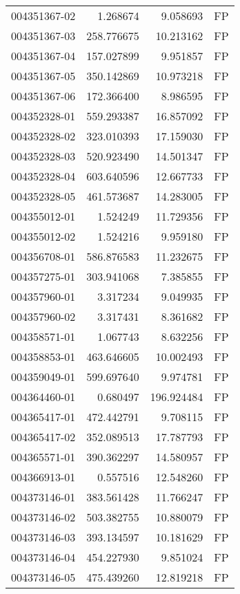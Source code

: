 \begin{tabular}{lrrl}
004351367-02 &    1.268674 &     9.058693 &   FP \\
004351367-03 &  258.776675 &    10.213162 &   FP \\
004351367-04 &  157.027899 &     9.951857 &   FP \\
004351367-05 &  350.142869 &    10.973218 &   FP \\
004351367-06 &  172.366400 &     8.986595 &   FP \\
004352328-01 &  559.293387 &    16.857092 &   FP \\
004352328-02 &  323.010393 &    17.159030 &   FP \\
004352328-03 &  520.923490 &    14.501347 &   FP \\
004352328-04 &  603.640596 &    12.667733 &   FP \\
004352328-05 &  461.573687 &    14.283005 &   FP \\
004355012-01 &    1.524249 &    11.729356 &   FP \\
004355012-02 &    1.524216 &     9.959180 &   FP \\
004356708-01 &  586.876583 &    11.232675 &   FP \\
004357275-01 &  303.941068 &     7.385855 &   FP \\
004357960-01 &    3.317234 &     9.049935 &   FP \\
004357960-02 &    3.317431 &     8.361682 &   FP \\
004358571-01 &    1.067743 &     8.632256 &   FP \\
004358853-01 &  463.646605 &    10.002493 &   FP \\
004359049-01 &  599.697640 &     9.974781 &   FP \\
004364460-01 &    0.680497 &   196.924484 &   FP \\
004365417-01 &  472.442791 &     9.708115 &   FP \\
004365417-02 &  352.089513 &    17.787793 &   FP \\
004365571-01 &  390.362297 &    14.580957 &   FP \\
004366913-01 &    0.557516 &    12.548260 &   FP \\
004373146-01 &  383.561428 &    11.766247 &   FP \\
004373146-02 &  503.382755 &    10.880079 &   FP \\
004373146-03 &  393.134597 &    10.181629 &   FP \\
004373146-04 &  454.227930 &     9.851024 &   FP \\
004373146-05 &  475.439260 &    12.819218 &   FP \\

\end{tabular}
